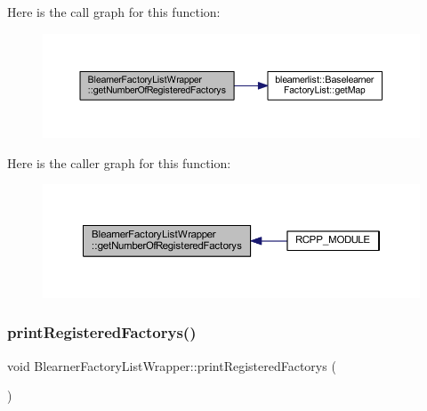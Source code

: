 Here is the call graph for this function\+:\nopagebreak
\begin{figure}[H]
\begin{center}
\leavevmode
\includegraphics[width=350pt]{class_blearner_factory_list_wrapper_ad497952e0c045016b70b94d06a713b44_cgraph}
\end{center}
\end{figure}
Here is the caller graph for this function\+:\nopagebreak
\begin{figure}[H]
\begin{center}
\leavevmode
\includegraphics[width=350pt]{class_blearner_factory_list_wrapper_ad497952e0c045016b70b94d06a713b44_icgraph}
\end{center}
\end{figure}
\mbox{\label{class_blearner_factory_list_wrapper_a53be3f4546c996827d03db1f637d2066}} 
\subsubsection{\texorpdfstring{print\+Registered\+Factorys()}{printRegisteredFactorys()}}
{\footnotesize\ttfamily void Blearner\+Factory\+List\+Wrapper\+::print\+Registered\+Factorys (\begin{DoxyParamCaption}{ }\end{DoxyParamCaption})\hspace{0.3cm}{\ttfamily [inline]}}

